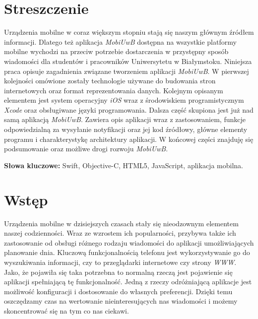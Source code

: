 \documentclass{iiuwb}
\begin{document}
\tableofcontents



\cleardoublepage
\lstlistoflistings

\listoffigures

\chapter*{Streszczenie}
\label{cha:Streszczenie}
Urządzenia mobilne w coraz większym stopniu stają się naszym głównym źródłem informacji. Dlatego też aplikacja \textit{MobiUwB} dostępna na wszystkie platformy mobilne wychodzi na przeciw potrzebie dostarczenia w przystępny sposób wiadomości dla studentów i pracowników Uniwersytetu w Białymstoku. Niniejsza praca opisuje zagadnienia związane tworzeniem aplikacji \textit{MobiUwB}. W pierwszej kolejności omówione zostały technologie używane do budowania stron internetowych oraz format reprezentowania danych. Kolejnym opisanym elementem jest system operacyjny \textit{iOS} wraz z środowiskiem programistycznym \textit{Xcode} oraz obsługiwane języki programowania. Dalsza część skupiona jest już nad samą aplikacją \textit{MobiUwB}. Zawiera opis aplikacji wraz z zastosowaniem, funkcje odpowiedzialną za wysyłanie notyfikacji oraz jej kod źródłowy, główne elementy programu i charakterystykę architektury aplikacji. W końcowej części znajduję się podsumowanie oraz możliwe drogi rozwoju \textit{MobiUwB}.

\textbf{Słowa kluczowe:} Swift, Objective-C, HTML5, 	JavaScript, aplikacja mobilna.

\cleardoublepage
\chapter*{Wstęp}                        %
\label{cha:Wstep}                       %
Urządzenia mobilne w dzisiejszych czasach stały się nieodzownym elementem naszej codzienności. Wraz ze wzrostem ich popularności, przybywa także ich zastosowanie od obsługi różnego rodzaju wiadomości do aplikacji umożliwiających planowanie dnia. Kluczową funkcjonalnością telefonu jest wykorzystywanie go do wyszukiwania informacji, czy to przeglądarki internetowe czy strony \textit{WWW}. Jako, że pojawiła się taka potrzebna to normalną rzeczą jest pojawienie się aplikacji spełniającą tę funkcjonalność. Jedną z rzeczy odróżniającą aplikacje jest możliwość konfiguracji i dostosowanie do własnych preferencji. Dzięki temu oszczędzamy czas na wertowanie nieinteresujących nas wiadomości i możemy skoncentrować się na tym co nas ciekawi. 
\end{document}
